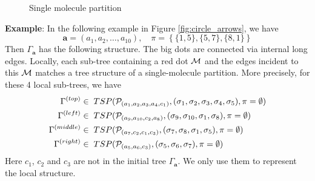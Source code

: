 \documentclass[10pt,reqno]{article}
\theoremstyle{plain} %
\theoremstyle{remark}
\numberwithin{equation}{section}
\begin{document}
\begin{figure}[ht]
    \caption{Single molecule partition}
    \label{fig:circle_arrows_0}
\end{figure}


\noindent 
{\bf Example}: In the following example in Figure \ref{fig:circle_arrows}, we have 
\begin{equation}\label{exn10}
  \textbf{a}=(a_1,a_2,\ldots,a_{10}), \quad \pi=\left\{ \{1,5\}, \{5,7\},\{8,1\}\right\}  
\end{equation} 
Then  $\Gamma_{\textbf{a}}$ has the following structure. The big dots are connected via internal long edges. Locally, each sub-tree containing a red dot ${\cal M}$ and the edges incident to this $\cal M$ matches a tree structure of a single-molecule partition. More precisely, for these 4 local sub-trees, we have  
\begin{align}
 \Gamma^{(top)}\in \;&\;TSP ({\cal P}_{(a_1,a_2,a_3,a_4, c_1)}, (\sigma_1, \sigma_2,\sigma_3,\sigma_4,\sigma_5) , \pi=\emptyset )
 \\\nonumber 
 \Gamma^{(left)}\in \;&\;TSP ({\cal P}_{(a_9,a_{10},c_2,a_8)}, (\sigma_9, \sigma_{10},\sigma_1,\sigma_8) , \pi=\emptyset )
 \\\nonumber  
 \Gamma^{(middle)}\in \;&\;TSP ({\cal P}_{(a_7,c_2,c_1,c_3)}, (\sigma_7, \sigma_8,\sigma_1,\sigma_5) , \pi=\emptyset )
   \\\nonumber   
\Gamma^{(right)}\in \;&\;TSP ({\cal P}_{(a_5,a_6,c_3)}, (\sigma_5, \sigma_6,\sigma_7) , \pi=\emptyset )
\end{align}
Here $c_1$, $c_2$ and $c_3$ are not in the initial tree $\Gamma_{\textbf{a}}$. We only use them to represent the local structure. 
\end{document}
